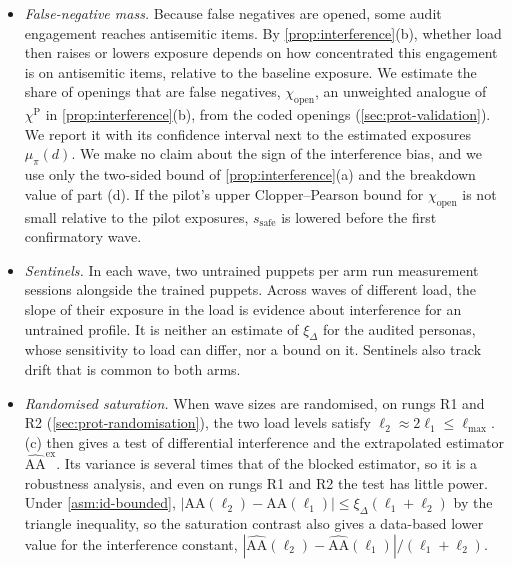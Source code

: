 \begin{itemize}
  \item \emph{False-negative mass.} Because false negatives are opened, some audit engagement reaches antisemitic items. By \cref{prop:interference}(b), whether load then raises or lowers exposure depends on how concentrated this engagement is on antisemitic items, relative to the baseline exposure. We estimate the share of openings that are false negatives, $\chi_{\mathrm{open}}$, an unweighted analogue of $\chi^{\mathrm P}$ in \cref{prop:interference}(b), from the coded openings (\cref{sec:prot-validation}). We report it with its confidence interval next to the estimated exposures $\mu_\pi(d)$. We make no claim about the sign of the interference bias, and we use only the two-sided bound of \cref{prop:interference}(a) and the breakdown value of part (d). If the pilot's upper Clopper--Pearson bound for $\chi_{\mathrm{open}}$ is not small relative to the pilot exposures, $s_{\mathrm{safe}}$ is lowered before the first confirmatory wave.
  \item \emph{Sentinels.} In each wave, two untrained puppets per arm run measurement sessions alongside the trained puppets. Across waves of different load, the slope of their exposure in the load is evidence about interference for an untrained profile. It is neither an estimate of $\xi_\Delta$ for the audited personas, whose sensitivity to load can differ, nor a bound on it. Sentinels also track drift that is common to both arms.
  \item \emph{Randomised saturation.} When wave sizes are randomised, on rungs R1 and R2 (\cref{sec:prot-randomisation}), the two load levels satisfy $\ell_2\approx2\ell_1\le\ell_{\max}$. (c) then gives a test of differential interference and the extrapolated estimator $\widehat{\mathrm{AA}}^{\mathrm{ex}}$. Its variance is several times that of the blocked estimator, so it is a robustness analysis, and even on rungs R1 and R2 the test has little power. Under \cref{asm:id-bounded}, $|\mathrm{AA}(\ell_2)-\mathrm{AA}(\ell_1)|\le\xi_\Delta(\ell_1+\ell_2)$ by the triangle inequality, so the saturation contrast also gives a data-based lower value for the interference constant, $|\widehat{\mathrm{AA}}(\ell_2)-\widehat{\mathrm{AA}}(\ell_1)|/(\ell_1+\ell_2)$.
\end{itemize}

